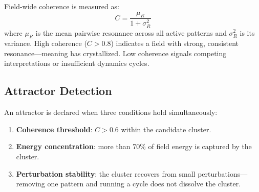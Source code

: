 Field-wide coherence is measured as:
\begin{equation}\label{eq:coherence}
C = \frac{\mu_R}{1 + \sigma_R^2}
\end{equation}
where $\mu_R$ is the mean pairwise resonance across all active patterns and $\sigma_R^2$ is its variance. High coherence ($C > 0.8$) indicates a field with strong, consistent resonance---meaning has crystallized. Low coherence signals competing interpretations or insufficient dynamics cycles.

\subsection{Attractor Detection}

An attractor is declared when three conditions hold simultaneously:
\begin{enumerate}
    \item \textbf{Coherence threshold}: $C > 0.6$ within the candidate cluster.
    \item \textbf{Energy concentration}: more than 70\% of field energy is captured by the cluster.
    \item \textbf{Perturbation stability}: the cluster recovers from small perturbations---removing one pattern and running a cycle does not dissolve the cluster.
\end{enumerate}
